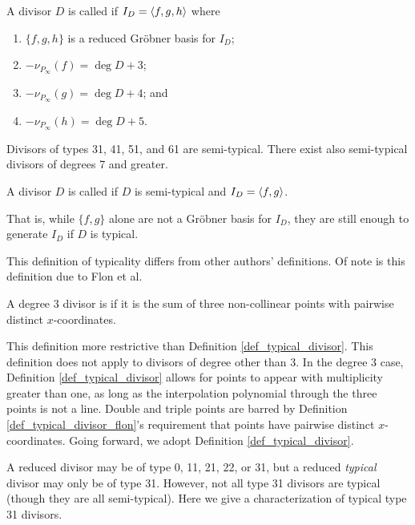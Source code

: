 \begin{definition}
  \label{def_semitypical_divisor}
  A divisor $D$ is called  if $I_D = \left\langle f, g, h \right\rangle$ where
  \begin{enumerate}[label=(\roman*)]
    \item $\{f, g, h\}$ is a reduced Gr\"obner basis for $I_D$;
    \item $-\nu_{P_\infty}(f) = \deg D + 3$;
    \item $-\nu_{P_\infty}(g) = \deg D + 4$; and
    \item $-\nu_{P_\infty}(h) = \deg D + 5$.
  \end{enumerate}
\end{definition}

Divisors of types 31, 41, 51, and 61 are semi-typical.
There exist also semi-typical divisors of degrees 7 and greater.

\begin{definition}
  \label{def_typical_divisor}
  A divisor $D$ is called  if $D$ is semi-typical and $I_D = \left\langle f, g \right\rangle$.
\end{definition}

That is, while $\{f, g\}$ alone are not a Gr\"obner basis for $I_D$,
they are still enough to generate $I_D$ if $D$ is typical.

This definition of typicality differs from other authors' definitions.
Of note is this definition due to Flon et al.

\begin{definition}
  \label{def_typical_divisor_flon}
  A degree 3 divisor is  if it is the sum of three non-collinear points
  with pairwise distinct $x$-coordinates.
\end{definition}

This definition more restrictive than Definition \ref{def_typical_divisor}.
This definition does not apply to divisors of degree other than 3.
In the degree 3 case, Definition \ref{def_typical_divisor} allows for points to appear with multiplicity
greater than one, as long as the interpolation polynomial through the three points is not a line.
Double and triple points are barred by Definition \ref{def_typical_divisor_flon}'s requirement that
points have pairwise distinct $x$-coordinates.
Going forward, we adopt Definition \ref{def_typical_divisor}.

A reduced divisor may be of type 0, 11, 21, 22, or 31,
but a reduced \emph{typical} divisor may only be of type 31.
However, not all type 31 divisors are typical (though they are all semi-typical).
Here we give a characterization of typical type 31 divisors.

